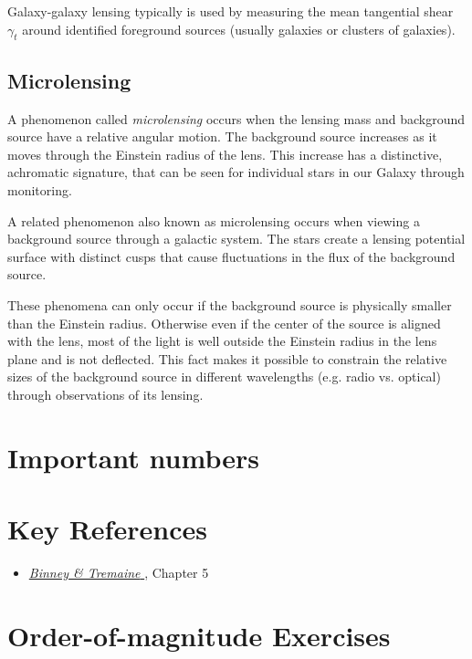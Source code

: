 Galaxy-galaxy lensing typically is used by measuring the mean
tangential shear $\gamma_t$ around identified foreground sources
(usually galaxies or clusters of galaxies). 

\subsection{Microlensing}

A phenomenon called {\it microlensing} occurs when the lensing mass
and background source have a relative angular motion. The background
source increases as it moves through the Einstein radius of the
lens. This increase has a distinctive, achromatic signature, that can
be seen for individual stars in our Galaxy through monitoring.

A related phenomenon also known as microlensing occurs when viewing a
background source through a galactic system. The stars create a
lensing potential surface with distinct cusps that cause fluctuations
in the flux of the background source.

These phenomena can only occur if the background source is physically
smaller than the Einstein radius. Otherwise even if the center of the
source is aligned with the lens, most of the light is well outside the
Einstein radius in the lens plane and is not deflected. This fact
makes it possible to constrain the relative sizes of the background
source in different wavelengths (e.g. radio vs. optical) through
observations of its lensing.

\section{Important numbers}

\section{Key References}

\begin{itemize}
  \item
    \href{http://adsabs.harvard.edu/abs/2000asqu.book.....C}{
    {\it Binney \& Tremaine}
      \citet{cox00a}}, Chapter 5
\end{itemize}

\section{Order-of-magnitude Exercises}

